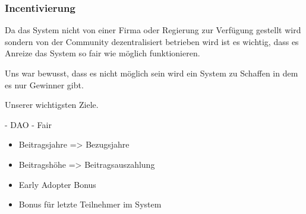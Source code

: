 \subsubsection{Incentivierung}

Da das System nicht von einer Firma oder Regierung zur Verfügung gestellt wird sondern von der Community dezentralisiert betrieben wird ist es wichtig, dass es Anreize das System so fair wie möglich funktionieren.

Uns war bewusst, dass es nicht möglich sein wird ein System zu Schaffen in dem es nur Gewinner gibt.

Unserer wichtigsten Ziele.

- DAO
- Fair



\begin{itemize}
\item Beitragsjahre => Bezugsjahre
\item Beitragshöhe => Beitragsauszahlung
\item Early Adopter Bonus
\item Bonus für letzte Teilnehmer im System
\end{itemize}
